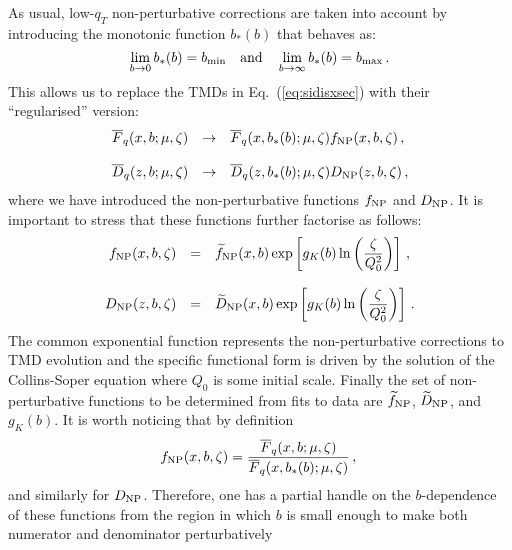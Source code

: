 \documentclass[10pt,a4paper]{article}
\begin{document}
As usual, low-$q_T$ non-perturbative corrections are taken into
account by introducing the monotonic function $b_*(b)$ that behaves
as:
\begin{equation}
  \lim_{b\rightarrow 0}
  b_*(b) = b_{\rm min}\quad\mbox{and}\quad\lim_{b\rightarrow \infty}
  b_*(b) = b_{\rm max}\,.
\end{equation}
This allows us to replace the TMDs in Eq.~(\ref{eq:sidisxsec}) with
their ``regularised'' version:
\begin{equation}\label{eq:fandDNP}
\begin{array}{rcl}
  \overline{F}_q(x,b;\mu,\zeta) &\rightarrow&
  \overline{F}_q(x,b_*(b);\mu,\zeta) f_{\rm NP}(x,b,\zeta)\,,\\
\\
  \overline{D}_q(z,b;\mu,\zeta) &\rightarrow&
  \overline{D}_q(z,b_*(b);\mu,\zeta) D_{\rm NP}(z,b,\zeta)\,,
\end{array}
\end{equation}
where we have introduced the non-perturbative functions $f_{\rm NP}$
and $D_{\rm NP}$. It is important to stress that these functions
further factorise as follows:
\begin{equation}\label{NPfuncts}
\begin{array}{rcl}
f_{\rm NP}(x,b,\zeta)&=&\displaystyle\widetilde{f}_{\rm NP}(x,b)\exp\left[g_K(b)\ln\left(\frac{\zeta}{Q_0^2}\right)\right]\,,\\
\\
D_{\rm NP}(z,b,\zeta) &=&\displaystyle\widetilde{D}_{\rm NP}(x,b)\exp\left[g_K(b)\ln\left(\frac{\zeta}{Q_0^2}\right)\right]\,.
\end{array}
\end{equation}
The common exponential function represents the non-perturbative
corrections to TMD evolution and the specific functional form is
driven by the solution of the Collins-Soper equation where $Q_0$ is
some initial scale. Finally the set of non-perturbative functions to
be determined from fits to data are $\widetilde{f}_{\rm NP}$,
$\widetilde{D}_{\rm NP}$, and $g_K(b)$. It is worth noticing that by definition
\begin{equation}
 f_{\rm NP}(x,b,\zeta) = \frac{\overline{F}_q(x,b;\mu,\zeta)}{\overline{F}_q(x,b_*(b);\mu,\zeta)} \,,\\
\end{equation}
and similarly for $D_{\rm NP}$. Therefore, one has a partial handle on
the $b$-dependence of these functions from the region in which $b$ is
small enough to make both numerator and denominator perturbatively
\end{document}
